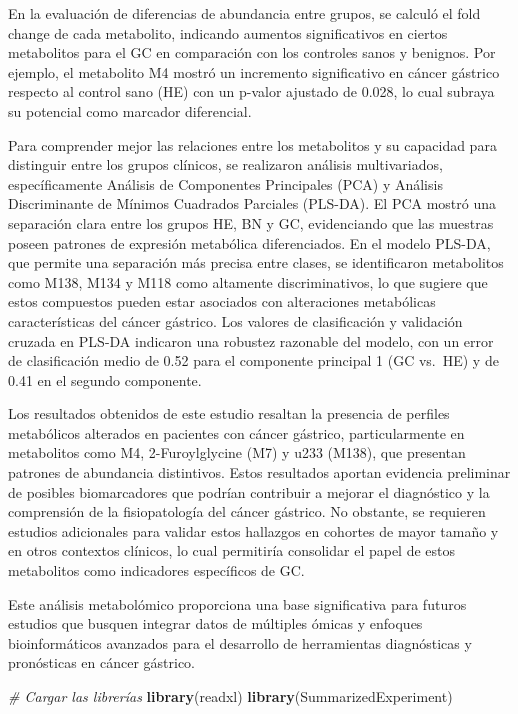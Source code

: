 \documentclass[
]{article}
\newenvironment{Shaded}{\begin{snugshade}}{\end{snugshade}}
\newcommand{\CommentTok}[1]{\textcolor[rgb]{0.56,0.35,0.01}{\textit{#1}}}
\newcommand{\FunctionTok}[1]{\textcolor[rgb]{0.13,0.29,0.53}{\textbf{#1}}}
\newcommand{\NormalTok}[1]{#1}
\begin{document}
En la evaluación de diferencias de abundancia entre grupos, se calculó
el fold change de cada metabolito, indicando aumentos significativos en
ciertos metabolitos para el GC en comparación con los controles sanos y
benignos. Por ejemplo, el metabolito M4 mostró un incremento
significativo en cáncer gástrico respecto al control sano (HE) con un
p-valor ajustado de 0.028, lo cual subraya su potencial como marcador
diferencial.

Para comprender mejor las relaciones entre los metabolitos y su
capacidad para distinguir entre los grupos clínicos, se realizaron
análisis multivariados, específicamente Análisis de Componentes
Principales (PCA) y Análisis Discriminante de Mínimos Cuadrados
Parciales (PLS-DA). El PCA mostró una separación clara entre los grupos
HE, BN y GC, evidenciando que las muestras poseen patrones de expresión
metabólica diferenciados. En el modelo PLS-DA, que permite una
separación más precisa entre clases, se identificaron metabolitos como
M138, M134 y M118 como altamente discriminativos, lo que sugiere que
estos compuestos pueden estar asociados con alteraciones metabólicas
características del cáncer gástrico. Los valores de clasificación y
validación cruzada en PLS-DA indicaron una robustez razonable del
modelo, con un error de clasificación medio de 0.52 para el componente
principal 1 (GC vs.~HE) y de 0.41 en el segundo componente.

Los resultados obtenidos de este estudio resaltan la presencia de
perfiles metabólicos alterados en pacientes con cáncer gástrico,
particularmente en metabolitos como M4, 2-Furoylglycine (M7) y u233
(M138), que presentan patrones de abundancia distintivos. Estos
resultados aportan evidencia preliminar de posibles biomarcadores que
podrían contribuir a mejorar el diagnóstico y la comprensión de la
fisiopatología del cáncer gástrico. No obstante, se requieren estudios
adicionales para validar estos hallazgos en cohortes de mayor tamaño y
en otros contextos clínicos, lo cual permitiría consolidar el papel de
estos metabolitos como indicadores específicos de GC.

Este análisis metabolómico proporciona una base significativa para
futuros estudios que busquen integrar datos de múltiples ómicas y
enfoques bioinformáticos avanzados para el desarrollo de herramientas
diagnósticas y pronósticas en cáncer gástrico.

\begin{Shaded}
\begin{Highlighting}[]
\CommentTok{\# Cargar las librerías}
\FunctionTok{library}\NormalTok{(readxl)}
\FunctionTok{library}\NormalTok{(SummarizedExperiment)}
\end{Highlighting}
\end{Shaded}
\end{document}
